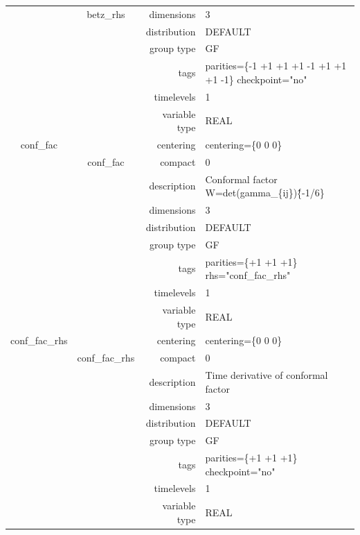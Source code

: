 \begin{tabular*}{150mm}{|c|c@{\extracolsep{\fill}}|rl|}
 & betz\_rhs & dimensions & 3 \\ 
 &  & distribution & DEFAULT \\ 
 &  & group type & GF \\ 
 &  & tags & parities=\{-1 +1 +1  +1 -1 +1  +1 +1 -1\} checkpoint="no" \\ 
 &  & timelevels & 1 \\ 
 &  & variable type & REAL \\ 
\hline 
conf\_fac &  & centering & centering=\{0 0 0\} \\ 
 & conf\_fac & compact & 0 \\ 
 &  & description & Conformal factor W=det(gamma\_\{ij\})\^\{-1/6\} \\ 
 &  & dimensions & 3 \\ 
 &  & distribution & DEFAULT \\ 
 &  & group type & GF \\ 
 &  & tags & parities=\{+1 +1 +1\} rhs="conf\_fac\_rhs" \\ 
 &  & timelevels & 1 \\ 
 &  & variable type & REAL \\ 
\hline 
conf\_fac\_rhs &  & centering & centering=\{0 0 0\} \\ 
 & conf\_fac\_rhs & compact & 0 \\ 
 &  & description & Time derivative of conformal factor \\ 
 &  & dimensions & 3 \\ 
 &  & distribution & DEFAULT \\ 
 &  & group type & GF \\ 
 &  & tags & parities=\{+1 +1 +1\} checkpoint="no" \\ 
 &  & timelevels & 1 \\ 
 &  & variable type & REAL \\ 
\hline 
\end{tabular*} 



\vspace{5mm}
\vspace{5mm}

